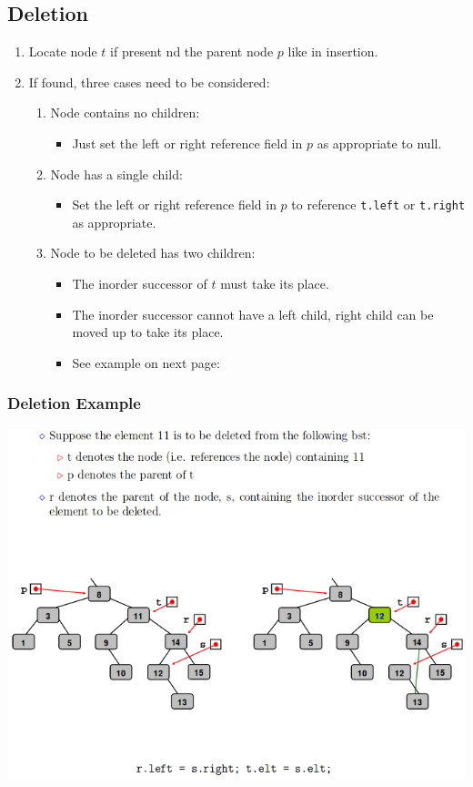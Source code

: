 \documentclass{beamer}
\begin{document}
\subsection{Deletion}
\begin{frame}
\begin{enumerate}
\item Locate node $t$ if present nd the parent node $p$ like in insertion.
\item If found, three cases need to be considered:
\begin{enumerate}
\item Node contains no children:
\begin{itemize}
\item Just set the left or right reference field in $p$ as appropriate to null.
\end{itemize}
\item Node has a single child:
\begin{itemize}
\item Set the left or right reference field in $p$ to reference \texttt{t.left} or \texttt{t.right} as appropriate.
\end{itemize}
\item Node to be deleted has two children:
\begin{itemize}
\item The {\color{red} inorder} successor of $t$ must take its place.
\item The inorder successor cannot have a left child, right child can be moved up to take  its place.
\item See example on next page:
\end{itemize}
\end{enumerate}
\end{enumerate}
\end{frame}
\begin{frame}
\frametitle{Deletion Example}
\includegraphics[scale=0.5]{deletion.png}
\end{frame}
\end{document}
